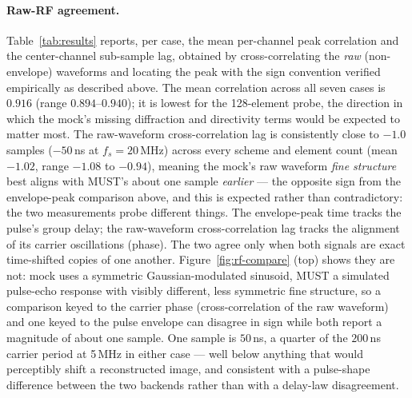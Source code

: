 \documentclass[11pt]{article}
\newcommand{\must}{MUST}
\begin{document}
\paragraph{Raw-RF agreement.} Table~\ref{tab:results} reports, per case, the
mean per-channel peak correlation and the center-channel sub-sample lag,
obtained by cross-correlating the \emph{raw} (non-envelope) waveforms and
locating the peak with the sign convention verified empirically as
described above. The mean correlation across all
seven cases is $0.916$ (range $0.894$--$0.940$); it is lowest for the
128-element probe, the direction in which the mock's missing diffraction and
directivity terms would be expected to matter most. The raw-waveform
cross-correlation lag is consistently close to $-1.0$ samples ($-50$\,ns at
$f_s=20$\,MHz) across every scheme and element count (mean $-1.02$, range
$-1.08$ to $-0.94$), meaning the mock's raw waveform \emph{fine structure}
best aligns with \must's about one sample \emph{earlier} --- the opposite
sign from the envelope-peak comparison above, and this is expected rather
than contradictory: the two measurements probe different things. The
envelope-peak time tracks the pulse's group delay; the raw-waveform
cross-correlation lag tracks the alignment of its carrier oscillations
(phase). The two agree only when both signals are exact time-shifted copies
of one another. Figure~\ref{fig:rf-compare} (top) shows they are not: mock
uses a symmetric Gaussian-modulated sinusoid, \must{} a simulated
pulse-echo response with visibly different, less symmetric fine structure,
so a comparison keyed to the carrier phase (cross-correlation of the raw
waveform) and one keyed to the pulse envelope can disagree in sign while
both report a magnitude of about one sample. One sample is $50$\,ns, a
quarter of the $200$\,ns carrier period at 5\,MHz in either case --- well
below anything that would perceptibly shift a reconstructed image, and
consistent with a pulse-shape difference between the two backends rather
than with a delay-law disagreement.
\end{document}

